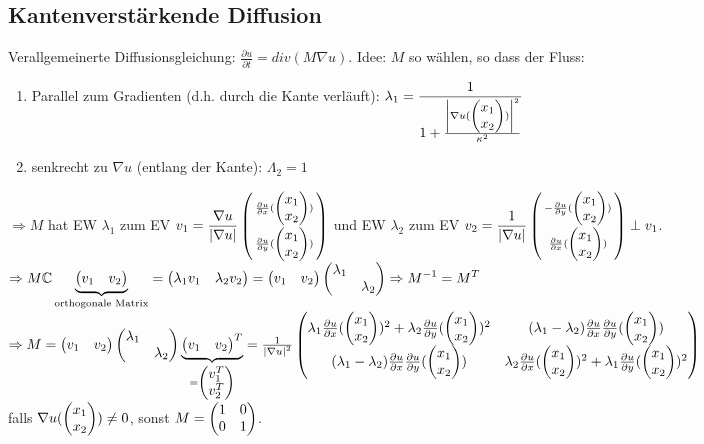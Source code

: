 \subsection{Kantenverstärkende Diffusion}
    Verallgemeinerte Diffusionsgleichung: $\displaystyle \frac{\partial u}{\partial t} = div(M \nabla u)$.
    Idee: $M$ so wählen, so dass der Fluss:
    \begin{enumerate}[label=-]
        \item Parallel zum Gradienten (d.h. durch die Kante verläuft): $\displaystyle \lambda_1=\frac{1}{1+\frac{\abs{\nabla u (\x)}^2}{\kappa^2}}$
        \item senkrecht zu $\nabla u$ (entlang der Kante): $\Lambda_2=1$
    \end{enumerate}

    $\Rightarrow M$ hat EW $\lambda_1$ zum EV $\displaystyle v_1= \frac{\nabla u}{\abs{\nabla u}}\srmatrix{\frac{\partial u}{\partial x}(\x)\\\frac{\partial u}{\partial y}(\x)}$ und EW $\lambda_2$ zum EV $\displaystyle v_2 = \frac{1}{\abs{\nabla u}} \srmatrix{-\frac{\partial u}{\partial y}(\x)\\\frac{\partial u}{\partial x}(\x)} \perp v_1$.\\
    $\displaystyle \Rightarrow M \C \underbrace{\mat{v_1 & v_2}}_{\small \text{orthogonale Matrix}} = \mat{\lambda_1 v_1 & \lambda_2 v_2} = \mat{v_1 & v_2} \mat{\lambda_1 & \ \\ \ & \lambda_2} \Rightarrow M^{-1} = M^T$\\
    $\Rightarrow M= \mat{v_1 & v_2} \mat{\lambda_1 & \ \\ \ & \lambda_2} \underbrace{\mat{v_1 & v_2}^T}_{=\mat{v_1^T \\ v_2^T}} = \frac{1}{\abs{\nabla u}^2} \mat{\lambda_1 \frac{\partial u}{\partial x}(\x)^2 + \lambda_2 \frac{\partial u}{\partial y}(\x)^2  & (\lambda_1 - \lambda_2)\frac{\partial u}{\partial x} \frac{\partial u}{\partial y}(\x)\\ (\lambda_1 - \lambda_2)\frac{\partial u}{\partial x} \frac{\partial u}{\partial y}(\x) & \lambda_2 \frac{\partial u}{\partial x}(\x)^2 + \lambda_1 \frac{\partial u}{\partial y}(\x)^2}$\\
    falls $\nabla u(\x) \neq 0$, sonst $M= \mat{1 & 0 \\ 0 & 1}$.

